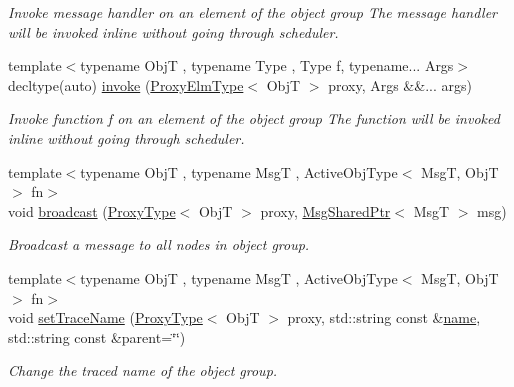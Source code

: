 \begin{DoxyCompactItemize}
\begin{DoxyCompactList}\small\item\em Invoke message handler on an element of the object group The message handler will be invoked inline without going through scheduler. \end{DoxyCompactList}\item 
{\footnotesize template$<$typename ObjT , typename Type , Type f, typename... Args$>$ }\\decltype(auto) \hyperlink{structvt_1_1objgroup_1_1_obj_group_manager_a86ceeea91a50386d51d5b6af06196d29}{invoke} (\hyperlink{structvt_1_1objgroup_1_1_obj_group_manager_adba6c8ecb0f4c30e719f1abb995cfc9b}{Proxy\+Elm\+Type}$<$ ObjT $>$ proxy, Args \&\&... args)
\begin{DoxyCompactList}\small\item\em Invoke function \textquotesingle{}f\textquotesingle{} on an element of the object group The function will be invoked inline without going through scheduler. \end{DoxyCompactList}\item 
{\footnotesize template$<$typename ObjT , typename MsgT , Active\+Obj\+Type$<$ Msg\+T, Obj\+T $>$ fn$>$ }\\void \hyperlink{structvt_1_1objgroup_1_1_obj_group_manager_a11a5b325363050d55b7428c84bcaa24b}{broadcast} (\hyperlink{structvt_1_1objgroup_1_1_obj_group_manager_aea65eef52f240a52210132eef5ce591f}{Proxy\+Type}$<$ ObjT $>$ proxy, \hyperlink{namespacevt_ab2b3d506ec8e8d1540aede826d84a239}{Msg\+Shared\+Ptr}$<$ MsgT $>$ msg)
\begin{DoxyCompactList}\small\item\em Broadcast a message to all nodes in object group. \end{DoxyCompactList}\item 
{\footnotesize template$<$typename ObjT , typename MsgT , Active\+Obj\+Type$<$ Msg\+T, Obj\+T $>$ fn$>$ }\\void \hyperlink{structvt_1_1objgroup_1_1_obj_group_manager_a922a82ded79fdefb5fd7de60bde77aad}{set\+Trace\+Name} (\hyperlink{structvt_1_1objgroup_1_1_obj_group_manager_aea65eef52f240a52210132eef5ce591f}{Proxy\+Type}$<$ ObjT $>$ proxy, std\+::string const \&\hyperlink{structvt_1_1objgroup_1_1_obj_group_manager_a92c0b07c2d90063c40087f625880cca3}{name}, std\+::string const \&parent=\char`\"{}\char`\"{})
\begin{DoxyCompactList}\small\item\em Change the traced name of the object group. \end{DoxyCompactList}\item 

\end{DoxyCompactItemize}
